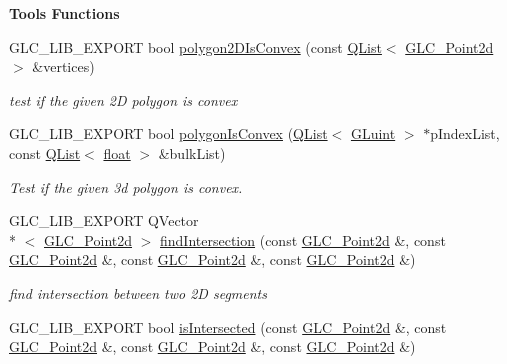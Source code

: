 \begin{Indent}{\bf Tools Functions}\par
\begin{DoxyCompactItemize}
\item 
G\-L\-C\-\_\-\-L\-I\-B\-\_\-\-E\-X\-P\-O\-R\-T bool \hyperlink{namespaceglc_aacdcc60584beb39feae6ca17888b18f7}{polygon2\-D\-Is\-Convex} (const \hyperlink{class_q_list}{Q\-List}$<$ \hyperlink{glc__vector2d_8h_aa2ff653e68023d8ac19c421c53fd764a}{G\-L\-C\-\_\-\-Point2d} $>$ \&vertices)
\begin{DoxyCompactList}\small\item\em test if the given 2\-D polygon is convex \end{DoxyCompactList}\item 
G\-L\-C\-\_\-\-L\-I\-B\-\_\-\-E\-X\-P\-O\-R\-T bool \hyperlink{namespaceglc_a7217a24d583f259a6e6b4ec4cb5406c8}{polygon\-Is\-Convex} (\hyperlink{class_q_list}{Q\-List}$<$ \hyperlink{glext_8h_a2f0c8cd5c21f9fcbd931c3f48bc90dfc}{G\-Luint} $>$ $\ast$p\-Index\-List, const \hyperlink{class_q_list}{Q\-List}$<$ \hyperlink{_super_l_u_support_8h_a6a1bb6ed41f44b60e7bd83b0e9945aa7}{float} $>$ \&bulk\-List)
\begin{DoxyCompactList}\small\item\em Test if the given 3d polygon is convex. \end{DoxyCompactList}\item 
G\-L\-C\-\_\-\-L\-I\-B\-\_\-\-E\-X\-P\-O\-R\-T Q\-Vector\\*
$<$ \hyperlink{glc__vector2d_8h_aa2ff653e68023d8ac19c421c53fd764a}{G\-L\-C\-\_\-\-Point2d} $>$ \hyperlink{namespaceglc_a5c369470a3a436cfdc056207fc38bc51}{find\-Intersection} (const \hyperlink{glc__vector2d_8h_aa2ff653e68023d8ac19c421c53fd764a}{G\-L\-C\-\_\-\-Point2d} \&, const \hyperlink{glc__vector2d_8h_aa2ff653e68023d8ac19c421c53fd764a}{G\-L\-C\-\_\-\-Point2d} \&, const \hyperlink{glc__vector2d_8h_aa2ff653e68023d8ac19c421c53fd764a}{G\-L\-C\-\_\-\-Point2d} \&, const \hyperlink{glc__vector2d_8h_aa2ff653e68023d8ac19c421c53fd764a}{G\-L\-C\-\_\-\-Point2d} \&)
\begin{DoxyCompactList}\small\item\em find intersection between two 2\-D segments \end{DoxyCompactList}\item 
G\-L\-C\-\_\-\-L\-I\-B\-\_\-\-E\-X\-P\-O\-R\-T bool \hyperlink{namespaceglc_ac9142f5e175abc2b6f96a2e58aa7b95c}{is\-Intersected} (const \hyperlink{glc__vector2d_8h_aa2ff653e68023d8ac19c421c53fd764a}{G\-L\-C\-\_\-\-Point2d} \&, const \hyperlink{glc__vector2d_8h_aa2ff653e68023d8ac19c421c53fd764a}{G\-L\-C\-\_\-\-Point2d} \&, const \hyperlink{glc__vector2d_8h_aa2ff653e68023d8ac19c421c53fd764a}{G\-L\-C\-\_\-\-Point2d} \&, const \hyperlink{glc__vector2d_8h_aa2ff653e68023d8ac19c421c53fd764a}{G\-L\-C\-\_\-\-Point2d} \&)

\end{DoxyCompactItemize}
\end{Indent}
